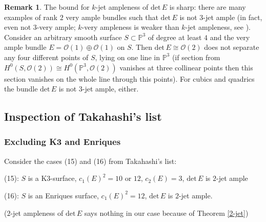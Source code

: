 \documentclass[a4paper]{amsart}
\theoremstyle{plain}
\theoremstyle{definition}
\newtheorem{remark}[theorem]{Remark}
\begin{document}
\begin{remark}
    The bound for $k$-jet ampleness of $\mathrm{det}\, E$ is sharp: there are many examples of rank $2$ very ample bundles such that $\mathrm{det}\, E$ is not $3$-jet ample
    (in fact, even not $3$-very ample; $k$-very ampleness is weaker than $k$-jet ampleness, see \cite{Beltrametti_kjet}).
    Consider an arbitrary smooth surface $S \subset \mathbb P^3$ of degree at least $4$ and the very ample bundle $E =\mathcal O(1)\oplus \mathcal O(1)$ on $S$.
    Then $\mathrm{det}\, E \cong \mathcal O(2)$ does not separate any four different points of $S$,
    lying on one line in $\mathbb P^3$
    (if section from $H^0(S, \mathcal O(2)) \cong H^0(\mathbb P^3, \mathcal O(2))$ vanishes at three collinear points then this section vanishes on the whole line through this points).
    For cubics and quadrics the bundle $\mathrm{det}\, E$ is not $3$-jet ample, either.
\end{remark}
\subsection{Inspection of Takahashi's list}
\label{inspection}
\subsubsection{Excluding K3 and Enriques}
\label{no_k3}
Consider the cases (15) and (16) from Takahashi's list:

(15): $S$ is a K3-surface, $c_1(E)^2 = 10$ or $12$, $c_2(E)= 3$, $\mathrm{det}\, E$ is $2$-jet ample

(16): $S$ is an Enriques surface, $c_1(E)^2 = 12$, $\mathrm{det}\, E$ is $2$-jet ample.

($2$-jet ampleness of $\mathrm{det}\, E$ says nothing in our case because of Theorem \ref{2-jet})
\end{document}
